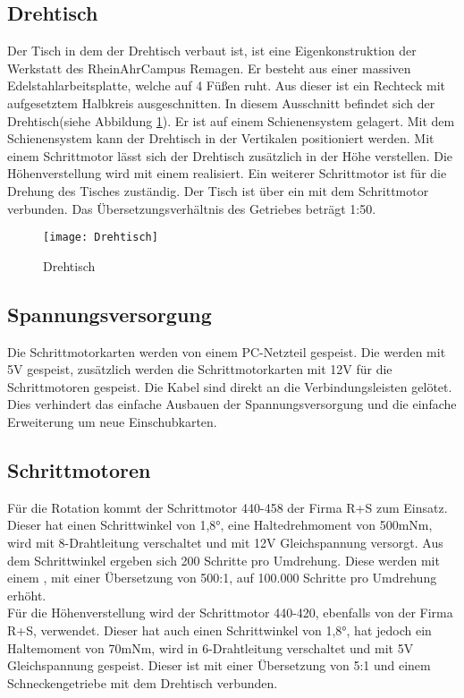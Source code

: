 \subsection{Drehtisch}
\label{sec:Drehtisch}
Der Tisch in dem der Drehtisch verbaut ist, ist eine Eigenkonstruktion der Werkstatt des RheinAhrCampus Remagen. Er besteht aus einer massiven Edelstahlarbeitsplatte, welche auf 4 Füßen ruht. Aus dieser ist ein Rechteck mit aufgesetztem Halbkreis ausgeschnitten. In diesem Ausschnitt befindet sich der Drehtisch(siehe Abbildung \ref{fig:Drehtisch}). Er ist auf einem Schienensystem gelagert. Mit dem Schienensystem kann der Drehtisch in der Vertikalen positioniert werden. Mit einem Schrittmotor lässt sich der Drehtisch zusätzlich in der Höhe verstellen. Die Höhenverstellung wird mit einem  realisiert. Ein weiterer Schrittmotor ist für die Drehung des Tisches zuständig. Der Tisch ist über ein  mit dem Schrittmotor verbunden. Das Übersetzungsverhältnis des Getriebes beträgt 1:50.  
\begin{figure}[h]
\centering
\texttt{[image: Drehtisch]}
\caption{Drehtisch}
\label{fig:Drehtisch}
\end{figure}
 
\subsection{Spannungsversorgung}
\label{sec:Spannungsv}
Die Schrittmotorkarten werden von einem PC-Netzteil gespeist. Die  werden mit 5V gespeist, zusätzlich werden die Schrittmotorkarten mit 12V für die Schrittmotoren gespeist. Die Kabel sind direkt an die Verbindungsleisten gelötet.\\
Dies verhindert das einfache Ausbauen der Spannungsversorgung und die einfache Erweiterung um neue Einschubkarten.
\subsection{Schrittmotoren}
\label{sec:Schrittmotoren}
Für die Rotation kommt der Schrittmotor 440-458 der Firma R+S zum Einsatz. Dieser hat einen Schrittwinkel von 1,8°, eine Haltedrehmoment von 500mNm, wird mit 8-Drahtleitung verschaltet und mit 12V Gleichspannung versorgt. Aus dem Schrittwinkel ergeben sich 200 Schritte pro Umdrehung. Diese werden mit einem , mit einer Übersetzung von 500:1, auf 100.000 Schritte pro Umdrehung erhöht.\\
Für die Höhenverstellung wird der Schrittmotor 440-420, ebenfalls von der Firma R+S, verwendet. Dieser hat auch einen Schrittwinkel von 1,8°, hat jedoch ein Haltemoment von 70mNm, wird in 6-Drahtleitung verschaltet und mit 5V Gleichspannung gespeist. Dieser ist mit einer Übersetzung von 5:1 und einem Schneckengetriebe mit dem Drehtisch verbunden.

